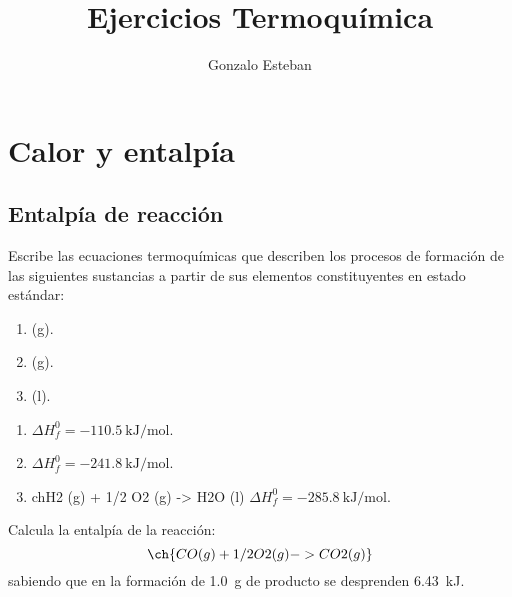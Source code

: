 \documentclass[10pt,a5paper,twoside]{article}
\title{Ejercicios Termoquímica}
\author{Gonzalo Esteban}
\begin{document}
\maketitle

\section{Calor y entalpía}

  \subsection*{Entalpía de reacción}


    \begin{exercise}[
        tags    = {termodinámica, entalpía, entalpia de reacción, calor},
        topics  = {química, termoquímica, termodinámica},
        source  = {FQ 1B ANA 2016, p164, e5},
      ]
      Escribe las ecuaciones termoquímicas que describen los procesos de formación de las siguientes sustancias a partir de sus elementos constituyentes en estado estándar:
      \begin{enumerate}
        \item {} (g).
        \item {} (g).
        \item {} (l).
      \end{enumerate}
    \end{exercise}

    \begin{solution}
      \begin{enumerate}
        \item {} \( \Delta H^0_f = \SI{-110.5}{\kilo\joule\per\mole} \).
        \item {} \( \Delta H^0_f = \SI{-241.8}{\kilo\joule\per\mole} \).
        \item ch{H2 (g) + 1/2 O2 (g) -> H2O (l)} \( \Delta H^0_f = \SI{-285.8}{\kilo\joule\per\mole} \).
      \end{enumerate}
    \end{solution}




    \begin{exercise}[
        tags    = {termodinámica, entalpía, entalpia de reacción, calor},
        topics  = {química, termoquímica, termodinámica},
        source  = {FQ 1B ANA 2016, p165, e14},
      ]
      Calcula la entalpía de la reacción:
      \[ \ch{CO (g) + 1/2 O2 (g) -> CO2 (g)} \]
      sabiendo que en la formación de \SI{1,0}{\gram} de producto se desprenden \SI{6,43}{\kilo\joule}.
    \end{exercise}
\end{document}
